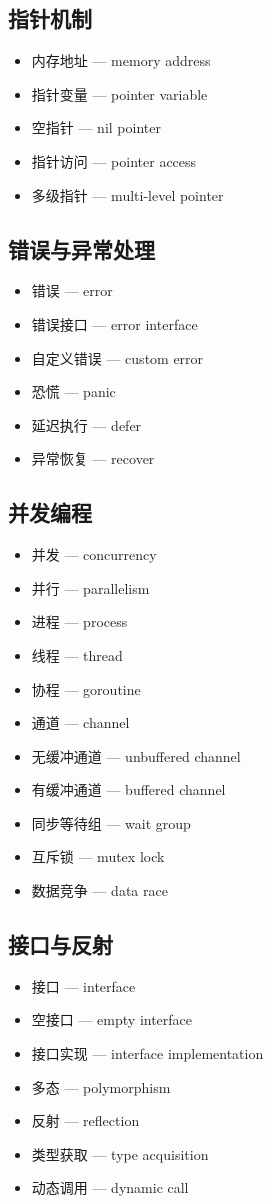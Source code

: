 \subsection{指针机制}
\begin{itemize}
\item 内存地址 — memory address
\item 指针变量 — pointer variable
\item 空指针 — nil pointer
\item 指针访问 — pointer access
\item 多级指针 — multi-level pointer
\end{itemize}

\subsection{错误与异常处理}
\begin{itemize}
\item 错误 — error
\item 错误接口 — error interface
\item 自定义错误 — custom error
\item 恐慌 — panic
\item 延迟执行 — defer
\item 异常恢复 — recover
\end{itemize}

\subsection{并发编程}
\begin{itemize}
\item 并发 — concurrency
\item 并行 — parallelism
\item 进程 — process
\item 线程 — thread
\item 协程 — goroutine
\item 通道 — channel
\item 无缓冲通道 — unbuffered channel
\item 有缓冲通道 — buffered channel
\item 同步等待组 — wait group
\item 互斥锁 — mutex lock
\item 数据竞争 — data race
\end{itemize}

\subsection{接口与反射}
\begin{itemize}
\item 接口 — interface
\item 空接口 — empty interface
\item 接口实现 — interface implementation
\item 多态 — polymorphism
\item 反射 — reflection
\item 类型获取 — type acquisition
\item 动态调用 — dynamic call
\end{itemize}

